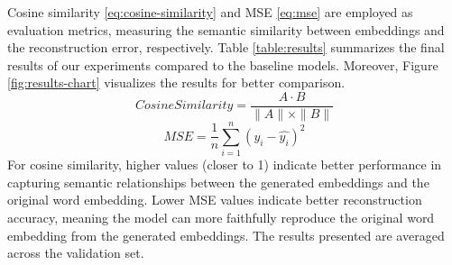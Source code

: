 \documentclass[12pt]{article}
\begin{document}
Cosine similarity \ref{eq:cosine-similarity} and MSE \ref{eq:mse} are employed as evaluation metrics, measuring the semantic similarity between embeddings and the reconstruction error, respectively. Table \ref{table:results} summarizes the final results of our experiments compared to the baseline models. Moreover, Figure \ref{fig:results-chart} visualizes the results for better comparison.
\begin{equation}\label{eq:cosine-similarity}
    Cosine Similarity = \frac{A \cdot B}{\|A\| \times \|B\|}
\end{equation}
\begin{equation}\label{eq:mse}
    MSE = \frac{1}{n} \sum_{i=1}^{n} (y_i - \hat{y_i})^2
\end{equation}
For cosine similarity, higher values (closer to 1) indicate better performance in capturing semantic relationships between the generated embeddings and the original word embedding. Lower MSE values indicate better reconstruction accuracy, meaning the model can more faithfully reproduce the original word embedding from the generated embeddings. The results presented are averaged across the validation set.
\end{document}
